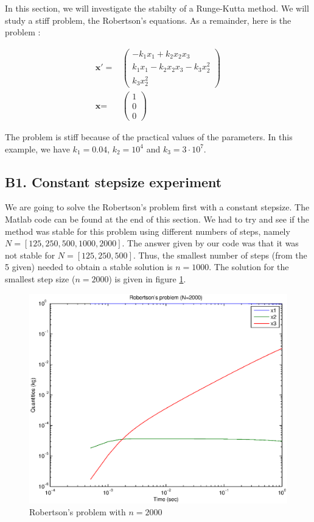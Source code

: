 In this section, we will investigate the stabilty of a Runge-Kutta method. We will study a stiff problem, the Robertson's equations. As a remainder, here is the problem : 

\begin{eqnarray*}
\textbf{x}' =& \left( \begin{array}{c}
-k_1x_1+k_2x_2x_3 \\ 
k_1x_1-k_2x_2x_3-k_3x_2^2 \\ 
k_3x_2^2 
\end{array} \right) \\
\textbf{x} =& \left( \begin{array}{c}
1 \\ 
0 \\ 
0 
\end{array} \right)
\end{eqnarray*}

The problem is stiff because of the practical values of the parameters. In this example, we have $k_1=0.04$, $k_2=10^4$ and $k_3=3 \cdot 10^7$.

\subsection*{B1. Constant stepsize experiment}

We are going to solve the Robertson's problem first with a constant stepsize. The Matlab code can be found at the end of this section. We had to try and see if the method was stable for this problem using different numbers of steps, namely $N = [125, 250, 500, 1000, 2000]$. The answer given by our code was that it was not stable for $N =[125, 250, 500]$. Thus, the smallest number of steps (from the 5 given) needed to obtain a stable solution is $n = 1000$. The solution for the smallest step size ($n = 2000$) is given in figure \ref{robert}.

\begin{figure}
\begin{center}
\includegraphics[scale=0.5]{robert.eps}
\caption{Robertson's problem with $n = 2000$}
\label{robert}
\end{center}
\end{figure}

